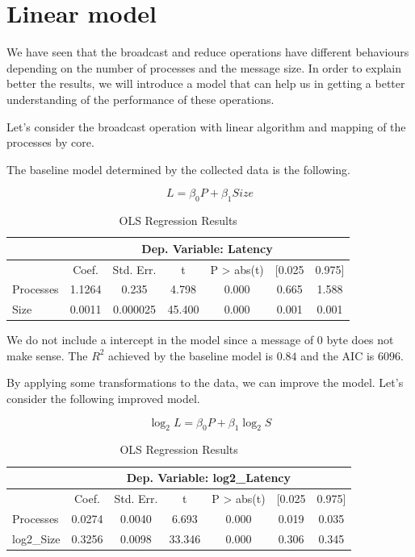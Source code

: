 \section{Linear model}

We have seen that the broadcast and reduce operations have different behaviours depending on the number of processes and the message size. In order to explain better the results, we will introduce a model that can help us in getting a better understanding of the performance of these operations.

Let's consider the broadcast operation with linear algorithm and mapping of the processes by core. 

The baseline model determined by the collected data is the following.

\begin{equation}
    L = \beta_0 P + \beta_1 Size
\end{equation}

\begin{table}[htbp]
    \centering
    \caption{OLS Regression Results}
    \begin{tabular}{lcccccc}
    \hline
    \hline
     & \multicolumn{6}{c}{Dep. Variable: Latency} \\
    \hline
     & Coef. & Std. Err. & t & P \textgreater{} abs(t) & [0.025 & 0.975] \\
    \hline
    Processes & 1.1264 & 0.235 & 4.798 & 0.000 & 0.665 & 1.588 \\
    Size & 0.0011 & 0.000025 & 45.400 & 0.000 & 0.001 & 0.001 \\
    \hline
    \end{tabular}
\end{table}
We do not include a intercept in the model since a message of $0$ byte does not make sense. The $R^2$ achieved by the baseline model is $0.84$ and the AIC is $6096$.
    

By applying some transformations to the data, we can improve the model.
Let's consider the following improved model.

\begin{equation}
    \log_{2}L = \beta_0 P + \beta_1 \log_{2} S
\end{equation}

\begin{table}[htbp]
    \centering
    \caption{OLS Regression Results}
    \begin{tabular}{lcccccc}
    \hline
     & \multicolumn{6}{c}{Dep. Variable: log2\_Latency} \\
    \hline
     & Coef. & Std. Err. & t & P \textgreater{} abs(t) & [0.025 & 0.975] \\
    \hline
    Processes & 0.0274 & 0.0040 & 6.693 & 0.000 & 0.019 & 0.035 \\
    log2\_Size & 0.3256 & 0.0098 & 33.346 & 0.000 & 0.306 & 0.345 \\
    \hline
    \end{tabular}
\end{table}

